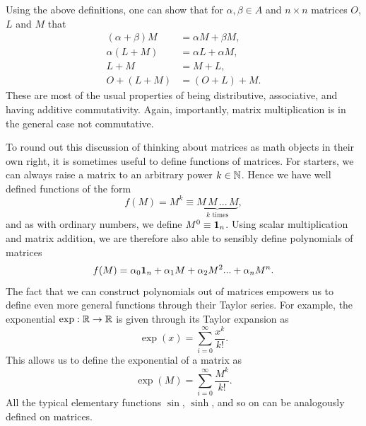 Using the above definitions, one can show that for $\alpha,\beta\in A$
and $n\times n$ matrices $O$, $L$ and $M$ that
\begin{equation}\begin{aligned}
(\alpha+\beta)M&=\alpha M+\beta M,\\
\alpha(L+M)&=\alpha L+\alpha M,\\
L+M&=M+L,\\
O+(L+M)&=(O+L)+M.
\end{aligned}\end{equation}
These are most of the usual properties of being distributive, associative,
and having additive commutativity.
Again, importantly, matrix multiplication is in the general case not
commutative.

To round out this discussion of thinking about matrices as math objects in their
own right, it is sometimes useful to define functions of matrices.
For starters, we can always
raise a matrix to an arbitrary power $k\in\mathbb{N}$. Hence we have well defined
functions of the form
\begin{equation}
f(M)=M^k\equiv\underbrace{M\,M\,...\,M}_{k\text{ times}},
\end{equation}
and as with ordinary numbers, we define $M^0\equiv {\mathbf 1}_n$.
Using scalar multiplication and matrix addition, we are therefore also
able to sensibly define polynomials of matrices
\begin{equation}
f(M)=\alpha_0{\mathbf 1}_n + \alpha_1 M + \alpha_2 M^2...+\alpha_n M^n.
\end{equation}
The fact that we can construct polynomials out of matrices empowers us
to define even more general functions through their Taylor series.
For example, the exponential $\exp:\mathbb{R}\to\mathbb{R}$ is given through its Taylor expansion
as
\begin{equation}
\exp(x)=\sum_{i=0}^\infty \frac{x^k}{k!}.
\end{equation}
This allows us to define the exponential of a matrix as
\begin{equation}\label{eq:expMat}
\exp(M)=\sum_{i=0}^\infty \frac{M^k}{k!}.
\end{equation}
All the typical elementary functions $\sin$, $\sinh$, and so on can be
analogously defined on matrices.

